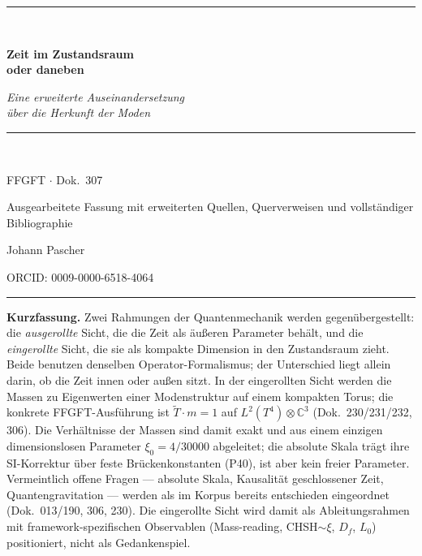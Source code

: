 \documentclass[11pt,a4paper]{article}
\begin{document}
\begin{titlepage}
\centering
\vspace*{2.2cm}
{\color{rulecol}\rule{0.5\textwidth}{0.6pt}}\\[1.4cm]
{\color{accent}\Huge\bfseries Zeit im Zustandsraum\\[0.3em] oder daneben\par}
\vspace{1.0cm}
{\large\itshape Eine erweiterte Auseinandersetzung\\ über die Herkunft der Moden\par}
\vspace{0.6cm}
{\color{accent2}\rule{0.28\textwidth}{0.4pt}}\\[1.0cm]
{\large FFGFT $\cdot$ Dok.~307\par}
\vspace{0.5cm}
{\normalsize Ausgearbeitete Fassung mit erweiterten Quellen, Querverweisen und vollständiger Bibliographie\par}
\vfill
{\large Johann Pascher\par}
\vspace{0.3cm}
{\footnotesize ORCID: 0009-0000-6518-4064\par}
\vspace{1.4cm}
{\color{rulecol}\rule{0.5\textwidth}{0.6pt}}
\vspace*{1.5cm}
\end{titlepage}

\tableofcontents
\thispagestyle{fancy}
\clearpage

\begingroup\small\noindent
\textbf{Kurzfassung.} Zwei Rahmungen der Quantenmechanik werden gegenübergestellt: die \emph{ausgerollte} Sicht, die die Zeit als äußeren Parameter behält, und die \emph{eingerollte} Sicht, die sie als kompakte Dimension in den Zustandsraum zieht. Beide benutzen denselben Operator-Formalismus; der Unterschied liegt allein darin, ob die Zeit innen oder außen sitzt. In der eingerollten Sicht werden die Massen zu Eigenwerten einer Modenstruktur auf einem kompakten Torus; die konkrete FFGFT-Ausführung ist $\tilde T\cdot m = 1$ auf $L^2(T^4)\otimes\mathbb{C}^3$ (Dok.~230/231/232, 306). Die Verhältnisse der Massen sind damit exakt und aus einem einzigen dimensionslosen Parameter $\xi_0 = 4/30000$ abgeleitet; die absolute Skala trägt ihre SI-Korrektur über feste Brückenkonstanten (P40), ist aber kein freier Parameter. Vermeintlich offene Fragen --- absolute Skala, Kausalität geschlossener Zeit, Quantengravitation --- werden als im Korpus bereits entschieden eingeordnet (Dok.~013/190, 306, 230). Die eingerollte Sicht wird damit als Ableitungsrahmen mit framework-spezifischen Observablen (Mass-reading, CHSH$\sim\xi$, $D_f$, $L_0$) positioniert, nicht als Gedankenspiel.
\par\endgroup
\end{document}
